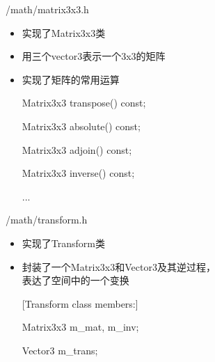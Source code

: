 \documentclass{beamer}
\begin{document}
\begin{frame} {/math/matrix3x3.h}
\begin{itemize}
\item 实现了Matrix3x3类
\item 用三个vector3表示一个3x3的矩阵
\item 实现了矩阵的常用运算
\begin{semiverbatim} \small Matrix3x3 transpose() const; \end{semiverbatim}
\begin{semiverbatim} \small Matrix3x3 absolute() const; \end{semiverbatim}
\begin{semiverbatim} \small Matrix3x3 adjoin() const; \end{semiverbatim}
\begin{semiverbatim} \small Matrix3x3 inverse() const; \end{semiverbatim}
\begin{semiverbatim} \small ... \end{semiverbatim}
\end{itemize}
\end{frame}

\begin{frame} {/math/transform.h}
\begin{itemize}
\item 实现了Transform类
\item 封装了一个Matrix3x3和Vector3及其逆过程，\\ 表达了空间中的一个变换
\begin{semiverbatim} \small [Transform class members:] \end{semiverbatim}
\begin{semiverbatim} \small Matrix3x3 m\_mat, m\_inv; \end{semiverbatim}
\begin{semiverbatim} \small Vector3 m\_trans; \end{semiverbatim}
\end{itemize}
\end{frame}
\end{document}

